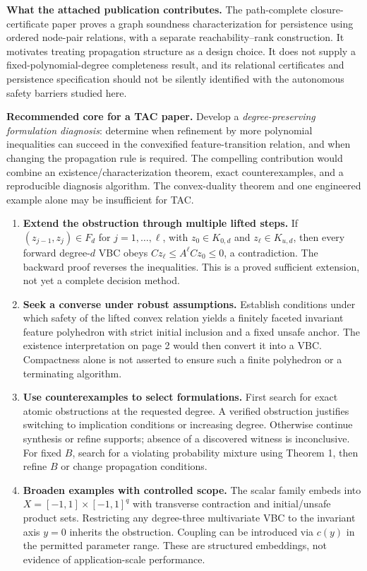 \documentclass[10pt,letterpaper]{article}
\begin{document}
\textbf{What the attached publication contributes.} The path-complete closure-certificate paper \cite{pccc} proves a graph soundness characterization for persistence using ordered node-pair relations, with a separate reachability--rank construction. It motivates treating propagation structure as a design choice. It does not supply a fixed-polynomial-degree completeness result, and its relational certificates and persistence specification should not be silently identified with the autonomous safety barriers studied here.

\textbf{Recommended core for a TAC paper.} Develop a \emph{degree-preserving formulation diagnosis}: determine when refinement by more polynomial inequalities can succeed in the convexified feature-transition relation, and when changing the propagation rule is required. The compelling contribution would combine an existence/characterization theorem, exact counterexamples, and a reproducible diagnosis algorithm. The convex-duality theorem and one engineered example alone may be insufficient for TAC.
\begin{enumerate}
\item \textbf{Extend the obstruction through multiple lifted steps.} If $(z_{j-1},z_j)\in F_d$ for $j=1,\ldots,\ell$, with $z_0\in K_{0,d}$ and $z_\ell\in K_{u,d}$, then every forward degree-$d$ VBC obeys $Cz_\ell\leq A^\ell Cz_0\leq0$, a contradiction. The backward proof reverses the inequalities. This is a proved sufficient extension, not yet a complete decision method.
\item \textbf{Seek a converse under robust assumptions.} Establish conditions under which safety of the lifted convex relation yields a finitely faceted invariant feature polyhedron with strict initial inclusion and a fixed unsafe anchor. The existence interpretation on page 2 would then convert it into a VBC. Compactness alone is not asserted to ensure such a finite polyhedron or a terminating algorithm.
\item \textbf{Use counterexamples to select formulations.} First search for exact atomic obstructions at the requested degree. A verified obstruction justifies switching to implication conditions or increasing degree. Otherwise continue synthesis or refine supports; absence of a discovered witness is inconclusive. For fixed $B$, search for a violating probability mixture using Theorem 1, then refine $B$ or change propagation conditions.
\item \textbf{Broaden examples with controlled scope.} The scalar family embeds into $X=[-1,1]\times[-1,1]^q$ with transverse contraction and initial/unsafe product sets. Restricting any degree-three multivariate VBC to the invariant axis $y=0$ inherits the obstruction. Coupling can be introduced via $c(y)$ in the permitted parameter range. These are structured embeddings, not evidence of application-scale performance.
\end{enumerate}
\end{document}
